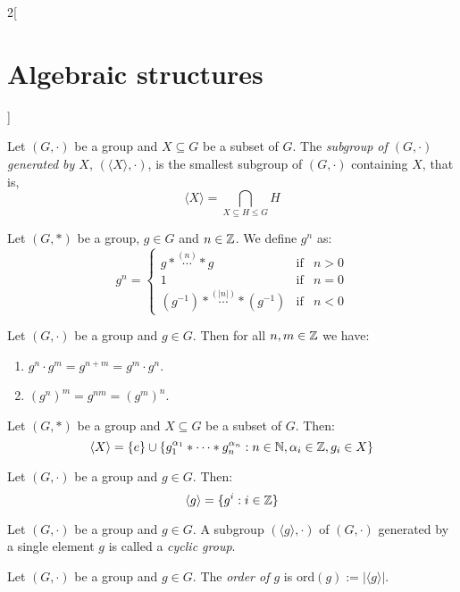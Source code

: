 \documentclass[../../../main.tex]{subfiles}
\begin{document}
\begin{multicols}{2}[\section{Algebraic structures}]
\begin{lemma}
    \end{lemma}
    \begin{definition}
        Let $(G,\cdot)$ be a group and $X\subseteq G$ be a subset of $G$. The \textit{subgroup of $(G,\cdot)$ generated by $X$}, $(\langle X\rangle,\cdot)$, is the smallest subgroup of $(G,\cdot)$ containing $X$, that is, $$\langle X\rangle=\bigcap_{X\subseteq H\leq G}H$$
    \end{definition}
    \begin{definition}
        Let $(G,*)$ be a group, $g\in G$ and $n\in\mathbb{Z} $. We define $g^n$ as:
        $$g^n=\left\{
            \begin{array}{lll}
                g*\overset{(n)}{\cdots}* g                & \text{if} & n>0 \\
                1                                         & \text{if} & n=0 \\
                (g^{-1})*\overset{(|n|)}{\cdots}*(g^{-1}) & \text{if} & n<0
            \end{array}\right.$$
    \end{definition}
    \begin{lemma}
        Let $(G,\cdot)$ be a group and $g\in G$. Then for all $n,m\in\mathbb{Z} $ we have:
        \begin{enumerate}
            \item $g^n\cdot g^m=g^{n+m}=g^m\cdot g^n$.
            \item $(g^n)^m=g^{nm}=(g^m)^n$.
        \end{enumerate}
    \end{lemma}
    \begin{prop}
        Let $(G,*)$ be a group and $X\subseteq G$ be a subset of $G$. Then: $$\langle X\rangle=\{e\}\cup\{g_1^{\alpha_1}*\cdots* g_n^{\alpha_n}:n\in\mathbb{N} ,\alpha_i\in\mathbb{Z} ,g_i\in X\}$$
    \end{prop}
    \begin{corollary}
        Let $(G,\cdot)$ be a group and $g\in G$. Then: $$\langle g\rangle=\{g^i:i\in\mathbb{Z} \}$$
    \end{corollary}
    \begin{definition}
        Let $(G,\cdot)$ be a group and $g\in G$. A subgroup $(\langle g\rangle,\cdot)$ of $(G,\cdot)$ generated by a single element $g$ is called a \textit{cyclic group}.
    \end{definition}
    \begin{definition}
        Let $(G,\cdot)$ be a group and $g\in G$. The \textit{order of $g$} is $\text{ord}(g):=|\langle g\rangle|$.

\end{definition}
\end{multicols}
\end{document}
